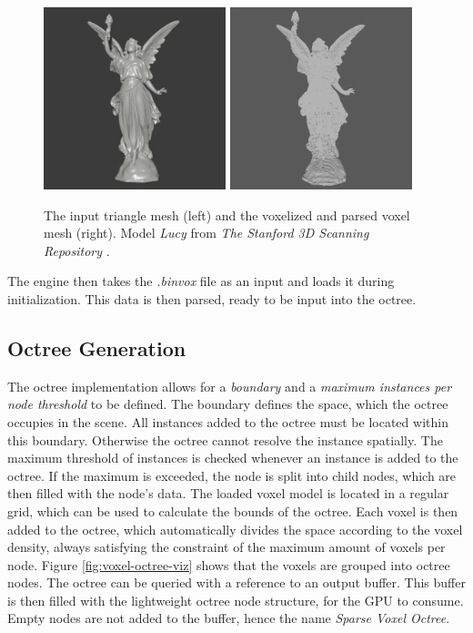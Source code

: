\begin{figure}[h]
    \centering
    \includegraphics[width=200px]{images/graphics/lucy-triangle-mesh.jpg}
    \includegraphics[width=200px]{images/graphics/lucy-voxel-mesh.jpg}
    \caption{The input triangle mesh (left) and the voxelized and parsed voxel mesh (right). 
    Model \emph{Lucy} from \emph{The Stanford 3D Scanning Repository} \cite{Stanford23}.}
    \label{fig:trimesh-to-voxel-mesh}
\end{figure}

\noindent
The engine then takes the \emph{.binvox} file as an input and loads it during initialization. This data is then
parsed, ready to be input into the octree.


\subsection*{Octree Generation}

The octree implementation allows for a \emph{boundary} and a \emph{maximum instances per node threshold} to be defined. 
The boundary defines the space, which the octree occupies in the scene. All instances added to the octree must 
be located within this boundary. Otherwise the octree cannot resolve the instance spatially. The maximum threshold 
of instances is checked whenever an instance is added to the octree. If the maximum is exceeded, the node is split into 
child nodes, which are then filled with the node's data. The loaded voxel model is located in a regular 
grid, which can be used to calculate the bounds of the octree. Each voxel is then added to the octree, which 
automatically divides the space according to the voxel density, always satisfying the constraint of the maximum 
amount of voxels per node. Figure \ref{fig:voxel-octree-viz} shows that the voxels are grouped into octree nodes. 
The octree can be queried with a reference to an output buffer. This buffer is then filled with the lightweight octree 
node structure, for the \ac{GPU} to consume. Empty nodes are not added to the buffer, hence the name \emph{Sparse 
Voxel Octree}. 


